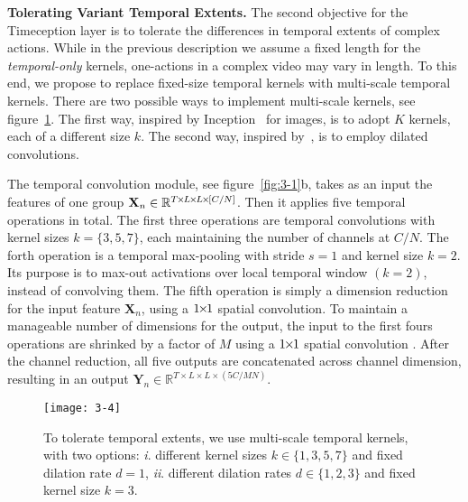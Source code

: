 \documentclass[10pt,twocolumn,letterpaper]{article}
\newcommand{\partitle}[1]{\noindent\textbf{#1}}
\begin{document}
\partitle{Tolerating Variant Temporal Extents.}
The second objective for the Timeception layer is to tolerate the differences in temporal extents of complex actions.
While in the previous description we assume a fixed length for the \emph{temporal-only} kernels, one-actions in a complex video may vary in length.
To this end, we propose to replace fixed-size temporal kernels with multi-scale temporal kernels.
There are two possible ways to implement multi-scale kernels, see figure~\ref{fig:3-4}.
The first way, inspired by Inception~\cite{szegedy2015going} for images, is to adopt $K$ kernels, each of a different size $k$.
The second way, inspired by~\cite{van2016wavenet}, is to employ dilated convolutions.

The temporal convolution module, see figure~\ref{fig:3-1}{\color{red}b}, takes as an input the features of one group $\mathbf{X}_n \in \mathbb{R}^{T {\mkern-2mu\times\mkern-2mu} L {\mkern-2mu\times\mkern-2mu} L {\mkern-2mu\times\mkern-2mu} [C/N]}$. Then it applies five temporal operations in total.
The first three operations are temporal convolutions with kernel sizes $k=\{3, 5, 7\}$, each maintaining the number of channels at $C/N$.
The forth operation is a temporal max-pooling with stride $s=1$ and kernel size $k=2$.
Its purpose is to max-out activations over local temporal window $(k=2)$, instead of convolving them.
The fifth operation is simply a dimension reduction for the input feature $\mathbf{X}_n$, using a $1 {\mkern-2mu\times\mkern-2mu} 1$ spatial convolution.
To maintain a manageable number of dimensions for the output, the input to the first fours operations are shrinked by a factor of $M$ using a $1 {\mkern-2mu\times\mkern-2mu} 1$ spatial convolution .
After the channel reduction, all five outputs are concatenated across channel dimension, resulting in an output $\mathbf{Y}_n \in \mathbb{R}^{T \times L \times L \times (5C/MN)}$.

\begin{figure}[!ht]
\begin{center}
\texttt{[image: 3-4]}
\end{center}
\caption{To tolerate temporal extents, we use multi-scale temporal kernels, with two options:
\textit{i}. different kernel sizes $k \in \{1,3,5,7\}$ and fixed dilation rate $d=1$,
\textit{ii}. different dilation rates $d \in \{1,2,3\}$ and fixed kernel size $k=3$.}
\label{fig:3-4}
\vspace*{-5mm}
\end{figure}
\end{document}
